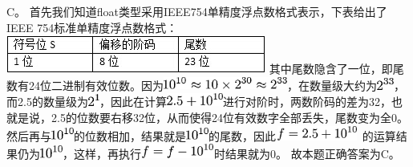 \begin{solution}C。 首先我们知道float类型采用IEEE754单精度浮点数格式表示，下表给出了IEEE
754标准单精度浮点数格式：
\includegraphics[width=3.36458in,height=0.48958in]{computerassets/8fda80d77778e6da3e4b1e749c1176cb.jpeg}
其中尾数隐含了一位，即尾数有24位二进制有效位数。因为\includegraphics[width=1.60417in,height=0.16667in]{texmath/7f1bb15Cdpi7B3507D7B105E7B107D7D5Capprox105Ctimes7B25E7B307D7D5Capprox7B25E7B337D7D}，在数量级大约为\includegraphics[width=0.21875in,height=0.15625in]{texmath/803bcc5Cdpi7B3507D25E7B337D}，而2.5的数量级为\includegraphics[width=0.14583in,height=0.15625in]{texmath/3177ee5Cdpi7B3507D25E1}，因此在计算\includegraphics[width=0.72917in,height=0.16667in]
{texmath/8a2ef45Cdpi7B3507D252B7B105E7B107D7D}进行对阶时，两数阶码的差为32，也就是说，2.5的位数要右移32位，从而使得24位有效数字全部丢失，尾数变为全0。然后再与\includegraphics[width=0.29167in,height=0.16667in]{texmath/22e2745Cdpi7B3507D105E7B107D}的位数相加，结果就是\includegraphics[width=0.29167in,height=0.16667in]{texmath/22e2745Cdpi7B3507D105E7B107D}的尾数，因此\includegraphics[width=1.07292in,height=0.18750in]
{texmath/61eb235Cdpi7B3507Df3D252B7B105E7B107D7D}
的运算结果仍为\includegraphics[width=0.29167in,height=0.16667in]{texmath/22e2745Cdpi7B3507D105E7B107D}，这样，再执行\includegraphics[width=0.94792in,height=0.18750in]{texmath/caf6545Cdpi7B3507Df3Df-7B105E7B107D7D}时结果就为0。
故本题正确答案为C。
\end{solution}
